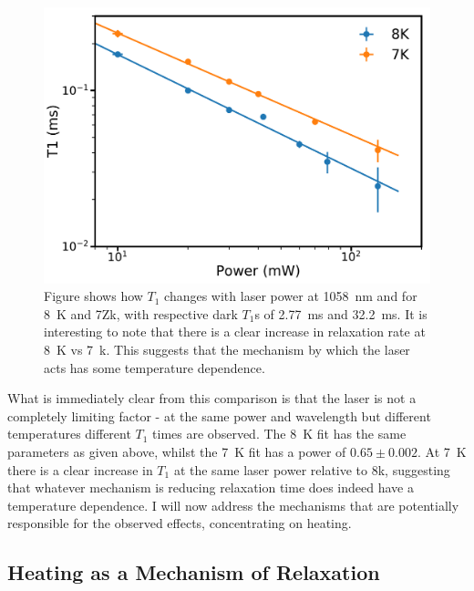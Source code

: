 \begin{figure}
\centering
\includegraphics[width=0.8\columnwidth]{Figures/T17Kvs8k_1058nmTest.pdf}
\caption[$T_1$ temperature comparison]{Figure shows how $T_1$ changes with laser power at 1058~nm and for 8~K and 7Zk, with respective dark $T_1$s of 2.77~ms and 32.2~ms. It is interesting to note that there is a clear increase in relaxation rate at 8~K vs 7~k. This suggests that the mechanism by which the laser acts has some temperature dependence.}
\label{fig:t1tempcomp}
\end{figure}

What is immediately clear from this comparison is that the laser is not a completely limiting factor - at the same power and wavelength but different temperatures different $T_1$ times are observed.
The 8~K fit has the same parameters as given above, whilst the 7~K fit has a power of $0.65\pm 0.002$.
At 7~K there is a clear increase in $T_1$ at the same laser power relative to 8k, suggesting that whatever mechanism is reducing relaxation time does indeed have a temperature dependence.
I will now address the mechanisms that are potentially responsible for the observed effects, concentrating on heating.

\subsection{Heating as a Mechanism of Relaxation}

